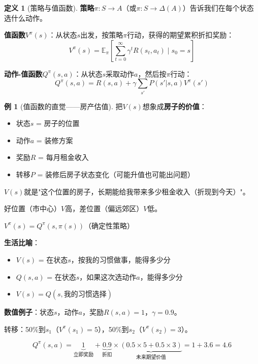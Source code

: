 \documentclass[11pt,a4paper]{article}
\theoremstyle{definition}
\newtheorem{definition}{定义}[section]
\newtheorem{example}{例}[section]
\begin{document}
\begin{definition}[策略与值函数]
\textbf{策略}$\pi: S \to A$（或$\pi: S \to \Delta(A)$）告诉我们在每个状态选什么动作。

\textbf{值函数}$V^\pi(s)$：从状态$s$出发，按策略$\pi$行动，获得的期望累积折扣奖励：
\[
V^\pi(s) = \mathbb{E}_\pi\left[\sum_{t=0}^\infty \gamma^t R(s_t, a_t) \mid s_0 = s\right]
\]

\textbf{动作-值函数}$Q^\pi(s,a)$：从状态$s$采取动作$a$，然后按$\pi$行动：
\[
Q^\pi(s,a) = R(s,a) + \gamma \sum_{s'} P(s'|s,a) V^\pi(s')
\]
\end{definition}

\begin{example}[值函数的直觉——房产估值]
把$V(s)$想象成\textbf{房子的价值}：

\begin{itemize}
    \item 状态$s$ = 房子的位置
    \item 动作$a$ = 装修方案
    \item 奖励$R$ = 每月租金收入
    \item 转移$P$ = 装修后房子状态变化（可能升值也可能出问题）
\end{itemize}

$V(s)$就是"这个位置的房子，长期能给我带来多少租金收入（折现到今天）"。

好位置（市中心）$V$高，差位置（偏远郊区）$V$低。
\end{example}

\begin{calculation}[$V$和$Q$的关系]
$V^\pi(s) = Q^\pi(s, \pi(s))$（确定性策略）

\textbf{生活比喻}：
\begin{itemize}
    \item $V(s)$ = 在状态$s$，按我的习惯做事，能得多少分
    \item $Q(s,a)$ = 在状态$s$，如果这次选动作$a$，能得多少分
    \item $V(s) = Q(s, \text{我的习惯选择})$
\end{itemize}

\textbf{数值例子}：状态$s$，动作$a$，奖励$R(s,a)=1$，$\gamma=0.9$。

转移：50\%到$s_1$（$V^\pi(s_1)=5$），50\%到$s_2$（$V^\pi(s_2)=3$）。

\[
Q^\pi(s,a) = \underbrace{1}_{\text{立即奖励}} + \underbrace{0.9}_{\text{折扣}} \times \underbrace{(0.5 \times 5 + 0.5 \times 3)}_{\text{未来期望价值}} = 1 + 3.6 = 4.6
\]
\end{calculation}
\end{document}
